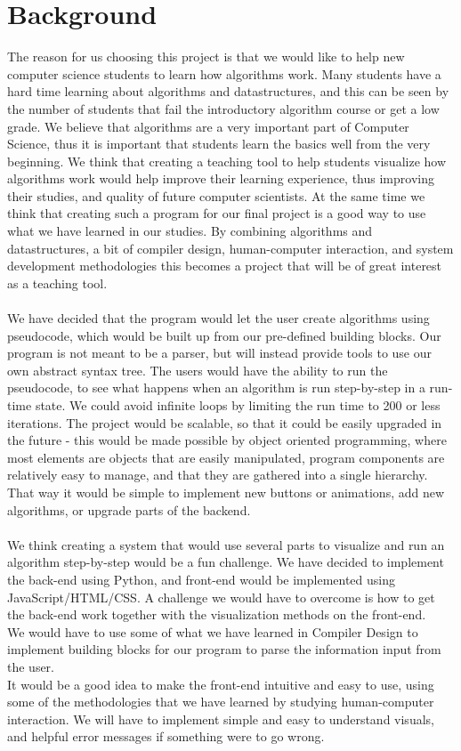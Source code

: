 \documentclass[11pt]{article}
\begin{document}
\section*{Background}
The reason for us choosing this project is that we would like to help new computer science students to learn how algorithms work. Many students have a hard time learning about algorithms and datastructures, and this can be seen by the number of students that fail the introductory algorithm course or get a low grade. We believe that algorithms are a very important part of Computer Science, thus it is important that students learn the basics well from the very beginning. We think that creating a teaching tool to help students visualize how algorithms work would help improve their learning experience, thus improving their studies, and quality of future computer scientists. At the same time we think that creating such a program for our final project is a good way to use what we have learned in our studies. By combining algorithms and datastructures, a bit of compiler design, human-computer interaction, and system development methodologies this becomes a project that will be of great interest as a teaching tool. 
\\\\
We have decided that the program would let the user create algorithms using pseudocode, which would be built up from our pre-defined building blocks. Our program is not meant to be a parser, but will instead provide tools to use our own abstract syntax tree. The users would have the ability to run the pseudocode, to see what happens when an algorithm is run step-by-step in a run-time state. We could avoid infinite loops by limiting the run time to 200 or less iterations. The project would be scalable, so that it could be easily upgraded in the future - this would be made possible by object oriented programming, where most elements are objects that are easily manipulated, program components are relatively easy to manage, and that they are gathered into a single hierarchy. That way it would be simple to implement new buttons or animations, add new algorithms, or upgrade parts of the backend.
\\\\
We think creating a system that would use several parts to visualize and run an algorithm step-by-step would be a fun challenge. We have decided to implement the back-end using Python, and front-end would be implemented using JavaScript/HTML/CSS. A challenge we would have to overcome is how to get the back-end work together with the visualization methods on the front-end.\\
We would have to use some of what we have learned in Compiler Design to implement building blocks for our program to parse the information input from the user.\\
It would be a good idea to make the front-end intuitive and easy to use, using some of the methodologies that we have learned by studying human-computer interaction. We will have to implement simple and easy to understand visuals, and helpful error messages if something were to go wrong.\\
\end{document}
